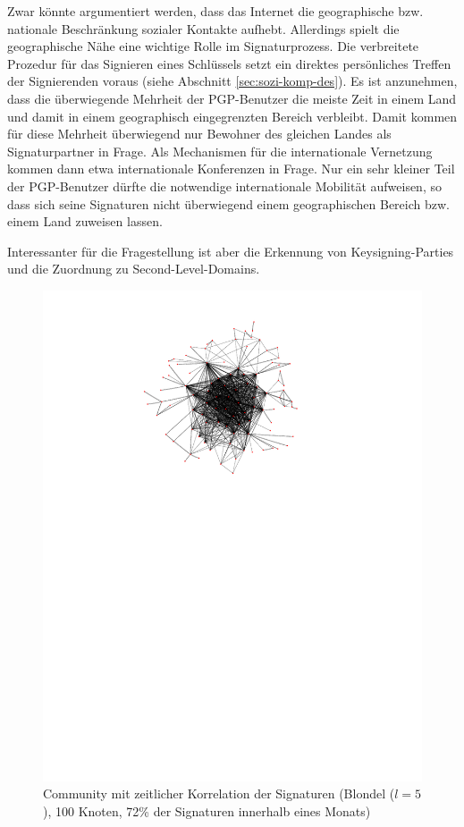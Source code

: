 Zwar k\"onnte argumentiert werden, dass das Internet die geographische
bzw. nationale Beschr\"ankung sozialer Kontakte aufhebt. Allerdings
spielt die geographische N\"ahe eine wichtige Rolle im
Signaturprozess. Die verbreitete Prozedur f\"ur das Signieren eines
Schl\"ussels setzt ein direktes pers\"onliches Treffen der
Signierenden voraus (siehe Abschnitt \ref{sec:sozi-komp-des}). Es ist
anzunehmen, dass die \"uberwiegende Mehrheit der PGP-Benutzer die
meiste Zeit in einem Land und damit in einem geographisch
eingegrenzten Bereich verbleibt. Damit kommen f\"ur diese Mehrheit
\"uberwiegend nur Bewohner des gleichen Landes als Signaturpartner in
Frage. Als Mechanismen f\"ur die internationale Vernetzung kommen dann
etwa internationale Konferenzen in Frage. Nur ein sehr kleiner Teil
der PGP-Benutzer d\"urfte die notwendige internationale Mobilit\"at
aufweisen, so dass sich seine Signaturen nicht \"uberwiegend einem
geographischen Bereich bzw. einem Land zuweisen lassen.

Interessanter f\"ur die Fragestellung ist aber die Erkennung von
Keysigning-Parties und die Zuordnung zu Second-Level-Domains. 

\begin{figure}[th]
  \centering
  \includegraphics[scale=1.5]{images/subgraph-label-time-fa62cc57cd35e9f90b85435efc407ad5.pdf}
  \caption{Community mit zeitlicher Korrelation der Signaturen
    (Blondel ($l=5$),
    100 Knoten, 72\% der Signaturen innerhalb eines Monats)}
  \label{fig:time-corr-com-normal}
\end{figure}


